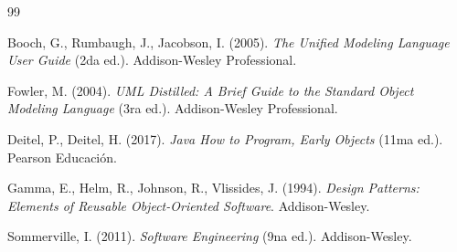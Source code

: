 \documentclass[letterpaper,12pt,oneside]{article}
\numberwithin{figure}{section}
\begin{document}
\begin{thebibliography}{99}

Booch, G., Rumbaugh, J., Jacobson, I. (2005). \textit{The Unified Modeling Language User Guide} (2da ed.). Addison-Wesley Professional.

Fowler, M. (2004). \textit{UML Distilled: A Brief Guide to the Standard Object Modeling Language} (3ra ed.). Addison-Wesley Professional.

Deitel, P., Deitel, H. (2017). \textit{Java How to Program, Early Objects} (11ma ed.). Pearson Educación.

Gamma, E., Helm, R., Johnson, R., Vlissides, J. (1994). \textit{Design Patterns: Elements of Reusable Object-Oriented Software}. Addison-Wesley.

Sommerville, I. (2011). \textit{Software Engineering} (9na ed.). Addison-Wesley.

\end{thebibliography}
\end{document}
